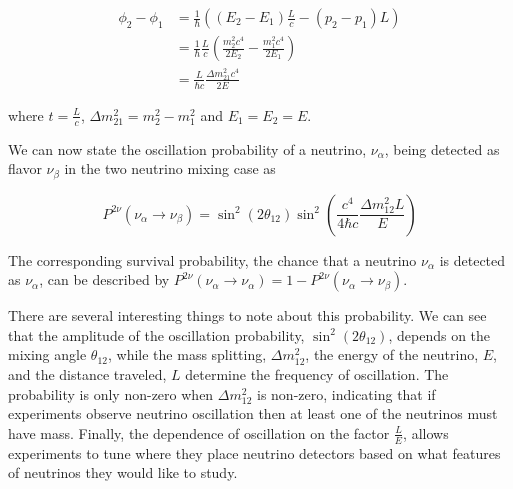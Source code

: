 \begin{equation}
\begin{split}
	\phi_2 - \phi_1 &= \frac{1}{\hbar}\left( (E_2 - E_1)\frac{L}{c} - (p_2 - p_1)L  \right)\\
	&=\frac{1}{\hbar}\frac{L}{c}\left(\frac{m_2^2c^4}{2E_2} - \frac{m_1^2c^4}{2E_1}\right) \\
	&=\frac{L}{\hbar c}\frac{\Delta m^2_{21}c^4}{2E}
\end{split}
\end{equation}

where $t = \frac{L}{c}$, $\Delta m^2_{21} = m_2^2 - m_1^2$ and $E_1 = E_2 = E$.

We can now state the oscillation probability of a neutrino, $\nu_\alpha$, being detected as flavor $\nu_\beta$ in the two neutrino mixing case as

\begin{equation}
	P^{2\nu}(\nu_\alpha \rightarrow \nu_\beta) = \sin^2\left(2\theta_{12}\right)\sin^2\left(\frac{c^4}{4\hbar c}\frac{\Delta m^2_{12}L}{E}\right) 
\end{equation}

The corresponding survival probability, the chance that a neutrino $\nu_\alpha$ is detected as $\nu_\alpha$, can be described by $P^{2\nu}(\nu_\alpha \rightarrow \nu_\alpha) = 1 - P^{2\nu}(\nu_\alpha \rightarrow \nu_\beta)$.

There are several interesting things to note about this probability. We can see that the amplitude of the oscillation probability, $\sin^2\left(2\theta_{12}\right)$, depends on the mixing angle $\theta_{12}$, while the mass splitting, $\Delta m^2_{12}$, the energy of the neutrino, $E$, and the distance traveled, $L$ determine the frequency of oscillation. 
The probability is only non-zero when $\Delta m^2_{12}$ is non-zero, indicating that if experiments observe neutrino oscillation then at least one of the neutrinos must have mass.
Finally, the dependence of oscillation on the factor $\frac{L}{E}$, allows experiments to tune where they place neutrino detectors based on what features of neutrinos they would like to study. 

